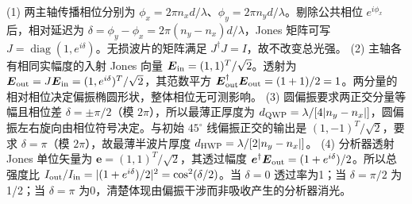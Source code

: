 (1) 两主轴传播相位分别为 \(\phi_x=2\pi n_xd/\lambda\)、\(\phi_y=2\pi n_yd/\lambda\)。剔除公共相位 \(e^{i\phi_x}\) 后，相对延迟为 \(\delta=\phi_y-\phi_x=2\pi(n_y-n_x)d/\lambda\)，Jones 矩阵可写 \(J=\operatorname{diag}(1,e^{i\delta})\)。无损波片的矩阵满足 \(J^\dagger J=I\)，故不改变总光强。
(2) 主轴各有相同实幅度的入射 Jones 向量 \(\boldsymbol E_{\rm in}=(1,1)^T/\sqrt2\)。透射为 \(\boldsymbol E_{\rm out}=J\boldsymbol E_{\rm in}=(1,e^{i\delta})^T/\sqrt2\)，其范数平方 \(\boldsymbol E_{\rm out}^\dagger\boldsymbol E_{\rm out}=(1+1)/2=1\)。两分量的相对相位决定偏振椭圆形状，整体相位无可测影响。
(3) 圆偏振要求两正交分量等幅且相位差 \(\delta=\pm\pi/2\)（模 \(2\pi\)），所以最薄正厚度为 \(d_{\rm QWP}=\lambda/[4|n_y-n_x|]\)，圆偏振左右旋向由相位符号决定。与初始 \(45^\circ\) 线偏振正交的输出是 \((1,-1)^T/\sqrt2\)，要求 \(\delta=\pi\)（模 \(2\pi\)），故最薄半波片厚度 \(d_{\rm HWP}=\lambda/[2|n_y-n_x|]\)。
(4) 分析器透射 Jones 单位矢量为 \(\boldsymbol e=(1,1)^T/\sqrt2\)，其透过幅度 \(\boldsymbol e^\dagger\boldsymbol E_{\rm out}=(1+e^{i\delta})/2\)。所以总强度比 \(I_{\rm out}/I_{\rm in}=|(1+e^{i\delta})/2|^2=\cos^2(\delta/2)\)。当 \(\delta=0\) 透过率为1；当 \(\delta=\pi/2\) 为1/2；当 \(\delta=\pi\) 为0，清楚体现由偏振干涉而非吸收产生的分析器消光。
